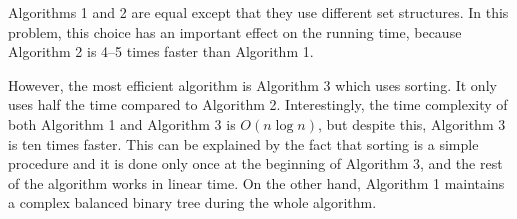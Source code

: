 Algorithms 1 and 2 are equal except that
they use different set structures.
In this problem, this choice has an important effect on
the running time, because Algorithm 2
is 4–5 times faster than Algorithm 1.

However, the most efficient algorithm is Algorithm 3
which uses sorting.
It only uses half the time compared to Algorithm 2.
Interestingly, the time complexity of both
Algorithm 1 and Algorithm 3 is $O(n \log n)$,
but despite this, Algorithm 3 is ten times faster.
This can be explained by the fact that
sorting is a simple procedure and it is done
only once at the beginning of Algorithm 3,
and the rest of the algorithm works in linear time.
On the other hand,
Algorithm 1 maintains a complex balanced binary tree
during the whole algorithm.

